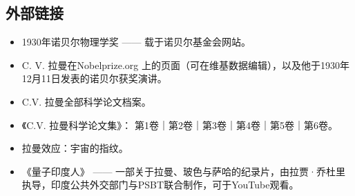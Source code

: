 \subsection{外部链接}
\begin{itemize}
\item 1930年诺贝尔物理学奖 —— 载于诺贝尔基金会网站。
\item C. V. 拉曼在Nobelprize.org 上的页面（可在维基数据编辑），以及他于1930年12月11日发表的诺贝尔获奖演讲。
\item C.V. 拉曼全部科学论文档案。
\item 《C.V. 拉曼科学论文集》：
第1卷｜第2卷｜第3卷｜第4卷｜第5卷｜第6卷。
\item 拉曼效应：宇宙的指纹。
\item 《量子印度人》 —— 一部关于拉曼、玻色与萨哈的纪录片，由拉贾·乔杜里执导，印度公共外交部门与PSBT联合制作，可于YouTube观看。
\end{itemize}